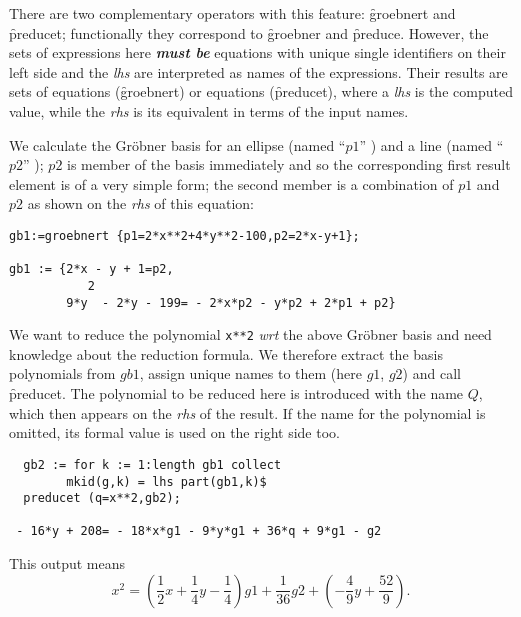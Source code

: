  
\hypertarget{operator:GROEBNERT}{}
\hypertarget{operator:PREDUCET}{}
There are two complementary operators with this feature: \f{groebnert}
and \f{preducet}; functionally they correspond to \f{groebner} and \f{preduce}.
However, the sets of expressions here \emph{\textbf{must be}} equations
with unique single identifiers on their left side and the {\it lhs} are
interpreted as names of the expressions. Their results are
sets of equations (\f{groebnert}) or equations (\f{preducet}), where
a {\it lhs} is the computed value, while the {\it rhs} is its equivalent
in terms of the input names.

\example {}

We calculate the Gr\"obner basis for an ellipse (named ``$p1$'' ) and a
line (named ``$p2$'' ); $p2$ is member of the basis immediately and so
the corresponding first result element is of a very simple form; the
second member is a combination of $p1$ and $p2$ as shown on the
{\it rhs} of this equation:

\begin{verbatim}
gb1:=groebnert {p1=2*x**2+4*y**2-100,p2=2*x-y+1};

gb1 := {2*x - y + 1=p2,
           2
        9*y  - 2*y - 199= - 2*x*p2 - y*p2 + 2*p1 + p2}
\end{verbatim}

\example {}

We want to reduce the polynomial \texttt{x**2} \emph{wrt}
the above Gr\"obner basis and need knowledge about the reduction
formula. We therefore extract the basis polynomials from $gb1$,
assign unique names to them (here $g1$, $g2$) and call \f{preducet}.
The polynomial to be reduced here is introduced with the name $Q$,
which then appears on the {\it rhs} of the result. If the name for the
polynomial is omitted, its formal value is used on the right side too.

\begin{verbatim}
  gb2 := for k := 1:length gb1 collect
        mkid(g,k) = lhs part(gb1,k)$
  preducet (q=x**2,gb2);

 - 16*y + 208= - 18*x*g1 - 9*y*g1 + 36*q + 9*g1 - g2
\end{verbatim}

This output means
\[
x^2 = (\frac{1}{2} x + \frac{1}{4} y - \frac{1}{4}) g1
 + \frac{1}{36} g2 + (-\frac{4}{9} y + \frac{52}{9}).
\]


\example {}

